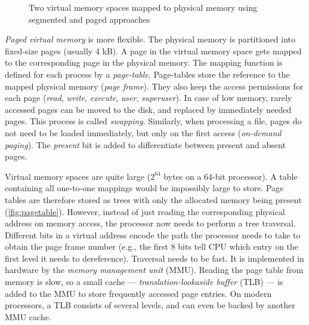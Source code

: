 \begin{figure}
  \caption{Two virtual memory spaces mapped to physical memory using segmented
  and paged approaches}
\end{figure}

\emph{Paged virtual memory} is more flexible. The physical memory is partitioned
into fixed-size pages (usually 4 kB). A page in the virtual memory space gets
mapped to the corresponding page in the physical memory. The mapping function is
defined for each process by a \emph{page-table}. Page-tables store the reference
to the mapped physical memory (\emph{page frame}). They also keep
the access permissions for each page (\emph{read}, \emph{write}, \emph{execute},
 \emph{user}, \emph{superuser}). In case of low memory, rarely accessed pages 
can be moved to the disk, and replaced by immediately needed pages. This process
is called \emph{swapping}. Similarly, when processing a file, pages do not need 
to be loaded immediately, but only on the first access (\emph{on-demand paging}). The
\emph{present} bit is added to differentiate between present and absent pages.

Virtual memory spaces are quite large ($2^{64}$ bytes on a 64-bit processor). A 
table containing all one-to-one mappings would be impossibly large to store. 
Page tables are therefore stored as trees with only the allocated memory being 
present (\cref{fig:pagetable}). However, instead of just reading the 
corresponding physical address on memory access, the processor now needs to 
perform a tree traversal. Different bits in a virtual address encode the path 
the processor needs to take to obtain the page frame number (e.g., the first 8
bits tell CPU which entry on the first level it needs to dereference). Traversal
needs to be fast. It is implemented in hardware by the \emph{memory management 
unit} (MMU). Reading the page table from memory is slow, so a small cache --- 
\emph{translation-lookaside buffer} (TLB) --- is 
added to the MMU to store frequently accessed page entries. On modern
processors, a TLB consists of
several levels, and can even be backed by another MMU cache. 

